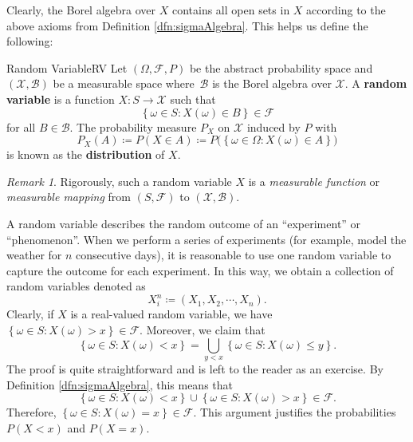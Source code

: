 \documentclass[math, code]{amznotes}
\theoremstyle{remark}
\newtheorem*{remark}{Remark}
\begin{document}
Clearly, the Borel algebra over $X$ contains all open sets in $X$ according to the above axioms from Definition \ref{dfn:sigmaAlgebra}. This helps us define the following:
\begin{dfnbox}{Random Variable}{RV}
    Let $\left(\Omega, \mathcal{F}, P\right)$ be the abstract probability space and $\left(\mathcal{X}, \mathcal{B}\right)$ be a measurable space where~$\mathcal{B}$ is the Borel algebra over $\mathcal{X}$. A {\color{red} \textbf{random variable}} is a function $X \colon S \to \mathcal{X}$ such that 
    \begin{equation*}
        \left\{\omega \in S \colon X\left(\omega\right) \in B\right\} \in \mathcal{F} 
    \end{equation*}
    for all $B \in \mathcal{B}$. The probability measure $P_X$ on $\mathcal{X}$ induced by $P$ with 
    \begin{equation*}
        P_X\left(A\right) \coloneqq P\left(X \in A\right) \coloneqq P\bigl(\left\{\omega \in \Omega \colon X\left(\omega\right) \in A\right\}\bigr)
    \end{equation*}
    is known as the {\color{red} \textbf{distribution}} of $X$.
\end{dfnbox}
\begin{notebox}
    \begin{remark}
        Rigorously, such a random variable $X$ is a \textit{measurable function} or \textit{measurable mapping} from $\left(S, \mathcal{F}\right)$ to $\left(\mathcal{X}, \mathcal{B}\right)$.
    \end{remark}
\end{notebox}
A random variable describes the random outcome of an ``experiment'' or ``phenomenon''. When we perform a series of experiments (for example, model the weather for $n$ consecutive days), it is reasonable to use one random variable to capture the outcome for each experiment. In this way, we obtain a collection of random variables denoted as 
\begin{equation*}
    X_i^n \coloneqq \left(X_1, X_2, \cdots, X_n\right).
\end{equation*}
Clearly, if $X$ is a real-valued random variable, we have $\left\{\omega \in S \colon X\left(\omega\right) > x\right\} \in \mathcal{F}$. Moreover, we claim that 
\begin{equation*}
    \left\{\omega \in S \colon X\left(\omega\right) < x\right\} = \bigcup_{y < x}\left\{\omega \in S \colon X\left(\omega\right) \leq y\right\}.
\end{equation*}
The proof is quite straightforward and is left to the reader as an exercise. By Definition \ref{dfn:sigmaAlgebra}, this means that 
\begin{equation*}
    \left\{\omega \in S \colon X\left(\omega\right) < x\right\} \cup \left\{\omega \in S \colon X\left(\omega\right) > x\right\} \in \mathcal{F}.
\end{equation*}
Therefore, $\left\{\omega \in S \colon X\left(\omega\right) = x\right\} \in \mathcal{F}$. This argument justifies the probabilities $P\left(X < x\right)$ and $P\left(X = x\right)$. 
\end{document}
